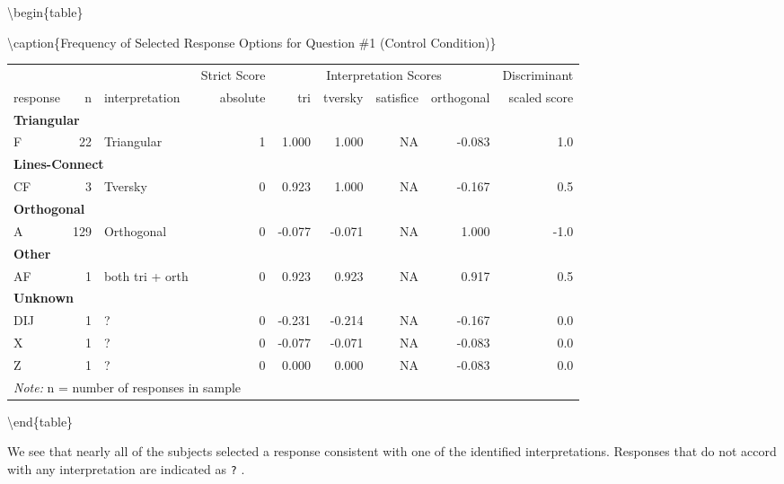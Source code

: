 \documentclass[
  letterpaper,
  DIV=11,
  numbers=noendperiod]{scrreprt}
\begin{document}
\textbackslash begin\{table\}

\textbackslash caption\{\label{tab:Q1-CONTROL-RESPONSES}Frequency of
Selected Response Options for Question \#1 (Control Condition)\}
\centering

\begin{tabular}[t]{l|r|l|r|r|r|r|r|r}
\hline
\multicolumn{3}{c|}{ } & \multicolumn{1}{c|}{Strict Score} & \multicolumn{4}{c|}{Interpretation Scores} & \multicolumn{1}{c}{Discriminant} \\
\cline{4-4} \cline{5-8} \cline{9-9}
response & n & interpretation & absolute & tri & tversky & satisfice & orthogonal & scaled score\\
\hline
\multicolumn{9}{l}{\textbf{Triangular}}\\
\hline
\hspace{1em}F & 22 & Triangular & 1 & 1.000 & 1.000 & NA & -0.083 & 1.0\\
\hline
\multicolumn{9}{l}{\textbf{Lines-Connect}}\\
\hline
\hspace{1em}CF & 3 & Tversky & 0 & 0.923 & 1.000 & NA & -0.167 & 0.5\\
\hline
\multicolumn{9}{l}{\textbf{Orthogonal}}\\
\hline
\hspace{1em}A & 129 & Orthogonal & 0 & -0.077 & -0.071 & NA & 1.000 & -1.0\\
\hline
\multicolumn{9}{l}{\textbf{Other}}\\
\hline
\hspace{1em}AF & 1 & both tri + orth & 0 & 0.923 & 0.923 & NA & 0.917 & 0.5\\
\hline
\multicolumn{9}{l}{\textbf{Unknown}}\\
\hline
\hspace{1em}DIJ & 1 & ? & 0 & -0.231 & -0.214 & NA & -0.167 & 0.0\\
\hline
\hspace{1em}X & 1 & ? & 0 & -0.077 & -0.071 & NA & -0.083 & 0.0\\
\hline
\hspace{1em}Z & 1 & ? & 0 & 0.000 & 0.000 & NA & -0.083 & 0.0\\
\hline
\multicolumn{9}{l}{\rule{0pt}{1em}\textit{Note: } n = number of responses in sample}\\
\end{tabular}

\textbackslash end\{table\}

We see that nearly all of the subjects selected a response consistent
with one of the identified interpretations. Responses that do not accord
with any interpretation are indicated as \texttt{?} .
\end{document}
